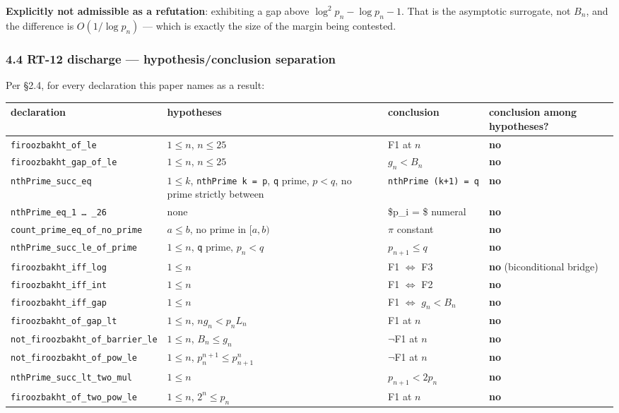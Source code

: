 \documentclass[
  a4paper,
  11pt]{article}
\begin{document}
\textbf{Explicitly not admissible as a refutation}: exhibiting a gap
above \(\log^2 p_n - \log p_n - 1\). That is the asymptotic surrogate,
not \(B_n\), and the difference is \(O(1/\log p_n)\) --- which is
exactly the size of the margin being contested.

\subsubsection{4.4 RT-12 discharge --- hypothesis/conclusion
separation}\label{44-rt-12-discharge--hypothesisconclusion-separation}

Per §2.4, for every declaration this paper names as a result:

\begin{longtable}[]{@{}llll@{}}
\toprule\noalign{}
declaration & hypotheses & conclusion & conclusion among hypotheses? \\
\midrule\noalign{}
\endhead
\bottomrule\noalign{}
\endlastfoot
\texttt{firoozbakht\_of\_le} & \(1\le n\), \(n\le 25\) & F1 at \(n\) &
\textbf{no} \\
\texttt{firoozbakht\_gap\_of\_le} & \(1\le n\), \(n\le 25\) &
\(g_n < B_n\) & \textbf{no} \\
\texttt{nthPrime\_succ\_eq} & \(1\le k\), \texttt{nthPrime\ k\ =\ p},
\texttt{q} prime, \(p<q\), no prime strictly between &
\texttt{nthPrime\ (k+1)\ =\ q} & \textbf{no} \\
\texttt{nthPrime\_eq\_1\ …\ \_26} & none & \$p\_i = \$ numeral &
\textbf{no} \\
\texttt{count\_prime\_eq\_of\_no\_prime} & \(a\le b\), no prime in
\([a,b)\) & \(\pi\) constant & \textbf{no} \\
\texttt{nthPrime\_succ\_le\_of\_prime} & \(1\le n\), \texttt{q} prime,
\(p_n<q\) & \(p_{n+1}\le q\) & \textbf{no} \\
\texttt{firoozbakht\_iff\_log} & \(1\le n\) & F1 \(\iff\) F3 &
\textbf{no} (biconditional bridge) \\
\texttt{firoozbakht\_iff\_int} & \(1\le n\) & F1 \(\iff\) F2 &
\textbf{no} \\
\texttt{firoozbakht\_iff\_gap} & \(1\le n\) & F1 \(\iff\) \(g_n<B_n\) &
\textbf{no} \\
\texttt{firoozbakht\_of\_gap\_lt} & \(1\le n\), \(n g_n < p_n L_n\) & F1
at \(n\) & \textbf{no} \\
\texttt{not\_firoozbakht\_of\_barrier\_le} & \(1\le n\), \(B_n \le g_n\)
& \(\neg\)F1 at \(n\) & \textbf{no} \\
\texttt{not\_firoozbakht\_of\_pow\_le} & \(1\le n\),
\(p_n^{n+1}\le p_{n+1}^n\) & \(\neg\)F1 at \(n\) & \textbf{no} \\
\texttt{nthPrime\_succ\_lt\_two\_mul} & \(1\le n\) & \(p_{n+1}<2p_n\) &
\textbf{no} \\
\texttt{firoozbakht\_of\_two\_pow\_le} & \(1\le n\), \(2^n \le p_n\) &
F1 at \(n\) & \textbf{no} \\
\end{longtable}
\end{document}
